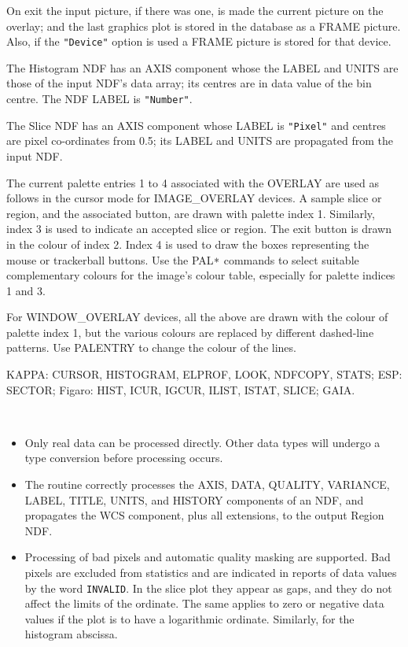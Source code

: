 \documentclass[twoside,11pt]{article}
\newcommand{\lsk}{\raisebox{-0.4ex}{\rm *}}
\newcommand{\sstdiytopic}[2]{\goodbreak \item[{\hspace{-0.35em}#1\hspace{-0.35em}:}] \mbox{} \\[1.3ex] #2}
\newcommand{\sstimplementationstatus}[1]{
   \pagebreak[3] \item[{Implementation Status:}] \mbox{} \\[1.3ex] #1}
\newenvironment{sstitemize}{%
  \vspace{-4.3ex}\begin{itemize}}{\end{itemize}}
\newcommand{\sstitemlist}[1]{
  \mbox{} \\
  \vspace{-3.5ex}
  \begin{sstitemize}
     #1
  \end{sstitemize}
}
\newcommand{\sstitem}{\item}
\renewcommand{\sstdiytopic}[2]{\item[{#1}]
      \begin{description}
         #2
      \end{description}
   }
\renewcommand{\sstimplementationstatus}[1]{\item[Implementation Status:] 
      \begin{description}
         #1
      \end{description}
   }
\newcommand{\sstitemlist}[1]{
      \begin{itemize}
         #1
      \end{itemize}
   }
\begin{document}
{{{         \sstitem
         On exit the input picture, if there was one, is made the
         current picture on the overlay; and the last graphics plot is
         stored in the database as a FRAME picture.  Also, if the
         {\tt "Device"} option is used a FRAME picture is stored for
         that device.

         \sstitem
         The Histogram NDF has an AXIS component whose the LABEL and
         UNITS are those of the input NDF's data array; its centres are
         in data value of the bin centre.  The NDF LABEL is {\tt "Number"}.

         \sstitem
         The Slice NDF has an AXIS component whose LABEL is {\tt "Pixel"} and
         centres are pixel co-ordinates from 0.5; its LABEL and UNITS are
         propagated from the input NDF.

         \sstitem
         The current palette entries 1 to 4 associated with the OVERLAY
         are used as follows in the cursor mode for IMAGE\_OVERLAY devices.
         A sample slice or region, and the associated button, are drawn
         with palette index 1.  Similarly, index 3 is used to indicate an
         accepted slice or region.  The exit button is drawn in the colour
         of index 2.  Index 4 is used to draw the boxes representing the
         mouse or trackerball buttons.  Use the PAL$\lsk$ commands to select
         suitable complementary colours for the image's colour table,
         especially for palette indices 1 and 3.

         For WINDOW\_OVERLAY devices, all the above are drawn with the
         colour of palette index 1, but the various colours are replaced
         by different dashed-line patterns.  Use PALENTRY to change the
         colour of the lines.
      }
   }
   \sstdiytopic{
      Related Applications
   }{
      KAPPA: CURSOR, HISTOGRAM, ELPROF, LOOK, NDFCOPY, STATS; ESP:
      SECTOR; Figaro: HIST, ICUR, IGCUR, ILIST, ISTAT, SLICE; GAIA.
   }
   \sstimplementationstatus{
      \sstitemlist{

         \sstitem
         Only real data can be processed directly.  Other data types
         will undergo a type conversion before processing occurs.

         \sstitem
         The routine correctly processes the AXIS, DATA, QUALITY, VARIANCE,
         LABEL, TITLE, UNITS, and HISTORY components of an NDF, and
         propagates the WCS component, plus all extensions, to the output 
         Region NDF.

         \sstitem
         Processing of bad pixels and automatic quality masking are
         supported.  Bad pixels are excluded from statistics and are
         indicated in reports of data values by the word {\tt INVALID}.  In the
         slice plot they appear as gaps, and they do not affect the limits
         of the ordinate.  The same applies to zero or negative data
         values if the plot is to have a logarithmic ordinate.  Similarly,
         for the histogram abscissa.
      }
   }
}
\end{document}

